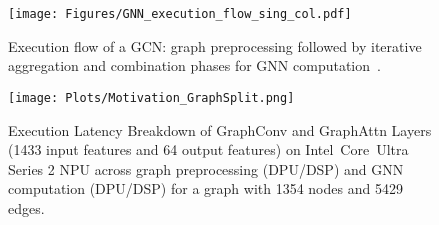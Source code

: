 \begin{figure}[t!]
\begin{center}
\texttt{[image: Figures/GNN\_execution\_flow\_sing\_col.pdf]}%
\end{center}
\caption{Execution flow of a GCN: graph preprocessing followed by iterative aggregation and combination phases for GNN computation~\cite{raha_book_chapter}.}\label{fig:GNN_agg_comb}
\end{figure}


\begin{figure}[t!]
\begin{center}
\texttt{[image: Plots/Motivation\_GraphSplit.png]}%
\end{center}
\caption{Execution Latency Breakdown of GraphConv and GraphAttn Layers (1433 input features and 64 output features) on Intel\textregistered\ Core\texttrademark\ Ultra Series 2 NPU across graph preprocessing (DPU/DSP) and GNN computation (DPU/DSP) for a graph with 1354 nodes and 5429 edges.}\label{fig:motivation_graphsplit}
\end{figure}



